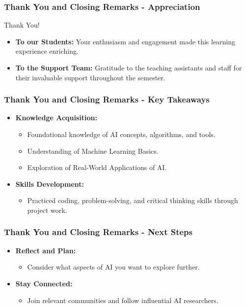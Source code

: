 \documentclass[aspectratio=169]{beamer}
\begin{document}
\begin{frame}[fragile]
    \frametitle{Thank You and Closing Remarks - Appreciation}
    \begin{block}{Thank You!}
        \begin{itemize}
            \item \textbf{To our Students:} Your enthusiasm and engagement made this learning experience enriching.
            \item \textbf{To the Support Team:} Gratitude to the teaching assistants and staff for their invaluable support throughout the semester.
        \end{itemize}
    \end{block}
\end{frame}

\begin{frame}[fragile]
    \frametitle{Thank You and Closing Remarks - Key Takeaways}
    \begin{itemize}
        \item \textbf{Knowledge Acquisition:}
        \begin{itemize}
            \item Foundational knowledge of AI concepts, algorithms, and tools.
            \item Understanding of Machine Learning Basics.
            \item Exploration of Real-World Applications of AI.
        \end{itemize}
        
        \item \textbf{Skills Development:}
        \begin{itemize}
            \item Practiced coding, problem-solving, and critical thinking skills through project work.
        \end{itemize}
    \end{itemize}
\end{frame}

\begin{frame}[fragile]
    \frametitle{Thank You and Closing Remarks - Next Steps}
    \begin{itemize}
        \item \textbf{Reflect and Plan:} 
        \begin{itemize}
            \item Consider what aspects of AI you want to explore further.
        \end{itemize}
        
        \item \textbf{Stay Connected:}
        \begin{itemize}
            \item Join relevant communities and follow influential AI researchers.
        \end{itemize}
    \end{itemize}
\end{frame}
\end{document}
